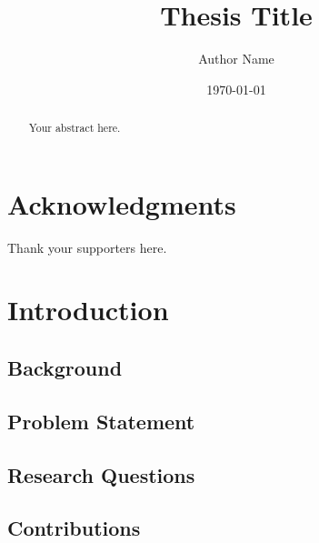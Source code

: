 \documentclass[12pt]{report}
\title{Thesis Title}
\author{Author Name}
\date{\today}
\begin{document}
\maketitle
\thispagestyle{empty}
\clearpage

\begin{abstract}

Your abstract here.

\end{abstract}

\chapter*{Acknowledgments}

Thank your supporters here.

\tableofcontents
\listoffigures
\listoftables

\chapter{Introduction}
\label{ch:introduction}

\section{Background}
\label{sec:background}


\section{Problem Statement}
\label{sec:problem}


\section{Research Questions}
\label{sec:questions}


\section{Contributions}
\label{sec:contributions}

\end{document}
